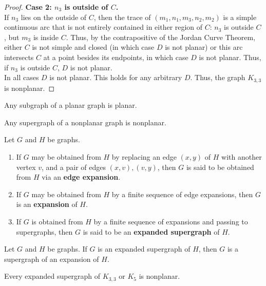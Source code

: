 \begin{proof}
  \textbf{Case 2: $n_3$ is outside of $C$.} \\
  If $n_3$ lies on the outside of $C$, then the trace of $(m_1, n_1, m_3, n_2, m_2)$ is a simple continuous arc that is not entirely contained in either region of $C$: $n_3$ is outside $C$, but $m_3$ is inside $C$. Thus, by the contrapositive of the Jordan Curve Theorem, either $C$ is not simple and closed (in which case $D$ is not planar) or this arc intersects $C$ at a point besides its endpoints, in which case $D$ is not planar. Thus, if $n_3$ is outside $C$, $D$ is not planar.\\
  In all cases $D$ is not planar. This holds for any arbitrary $D$. Thus, the graph $K_{3, 3}$ is nonplanar.
\end{proof}

\begin{theorem} Any subgraph of a planar graph is planar.
\end{theorem}

\begin{corollary} Any supergraph of a nonplanar graph is nonplanar.
\end{corollary}

\begin{definition} Let $G$ and $H$ be graphs.
\begin{enumerate}
    \item If $G$ may be obtained from $H$ by replacing an edge $(x, y)$ of $H$ with another vertex $v$, and a pair of edges $(x, v), (v, y)$, then $G$ is said to be obtained from $H$ via an \textbf{edge expansion}.
    \item If $G$ may be obtained from $H$ by a finite sequence of edge expansions, then $G$ is an \textbf{expansion} of $H$.
    \item If $G$ is obtained from $H$ by a finite sequence of expansions and passing to supergraphs, then $G$ is said to be an \textbf{expanded supergraph} of $H$.
\end{enumerate}
\end{definition}

\begin{theorem} Let $G$ and $H$ be graphs. If $G$ is an expanded supergraph of $H$, then $G$ is a supergraph of an expansion of $H$.
\end{theorem}

\begin{theorem} Every expanded supergraph of $K_{3,3}$ or $K_5$ is nonplanar.
\end{theorem}

